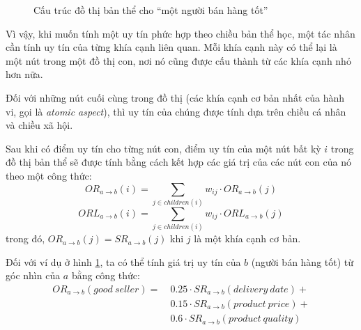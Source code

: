 \begin{figure}[H]
  \centering
  \caption{Cấu trúc đồ thị bản thể cho ``một người bán hàng tốt''}
  \label{fig:good-seller-ontological-structure}
\end{figure}

Vì vậy, khi muốn tính một uy tín phức hợp theo chiều bản thể học, một tác nhân cần tính uy tín của từng khía cạnh liên quan.
Mỗi khía cạnh này có thể lại là một nút trong một đồ thị con, nơi nó cũng được cấu thành từ các khía cạnh nhỏ hơn nữa.

Đối với những nút cuối cùng trong đồ thị (các khía cạnh cơ bản nhất của hành vi, gọi là \textit{atomic aspect}),
thì uy tín của chúng được tính dựa trên chiều cá nhân và chiều xã hội.

Sau khi có điểm uy tín cho từng nút con, điểm uy tín của một nút bất kỳ $i$ trong đồ thị bản thể sẽ được tính bằng cách kết hợp
các giá trị của các nút con của nó theo một công thức:
\[OR_{a \rightarrow b}(i) = \sum_{j \in children(i)} w_{ij} \cdot OR_{a \rightarrow b}(j)\]
\[ORL_{a \rightarrow b}(i) = \sum_{j \in children(i)} w_{ij} \cdot ORL_{a \rightarrow b}(j)\]
trong đó, $OR_{a \rightarrow b}(j) = SR_{a \rightarrow b}(j)$ khi $j$ là một khía cạnh cơ bản.

Đối với ví dụ ở hình \ref{fig:good-seller-ontological-structure}, ta có thể tính giá trị uy tín của $b$ (người bán hàng tốt)
từ góc nhìn của $a$ bằng công thức:
\begin{align*}
  OR_{a \rightarrow b}(good\ seller) =\  & 0.25 \cdot SR_{a \rightarrow b}(delivery\ date) + \\
                                         & 0.15 \cdot SR_{a \rightarrow b}(product\ price) + \\
                                         & 0.6 \cdot SR_{a \rightarrow b}(product\ quality)
\end{align*}


